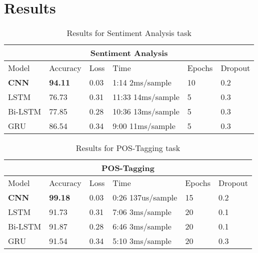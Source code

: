 \documentclass[twocolumn,12pt]{asme2ej}
\begin{document}
\section{Results}

\begin{table*}[t]
  \centering
    \begin{tabular}{ |p{2.5cm}||p{1.5cm}|p{1cm}|p{4cm}|p{1.5cm}|p{1.5cm}|  }
     \hline
     \multicolumn{6}{|c|}{Sentiment Analysis} \\
     \hline
     Model & Accuracy & Loss & Time & Epochs & Dropout\\
     \hline
     \textbf{CNN}   & \textbf{94.11} & 0.03 & 1:14 2ms/sample & 10 & 0.2  \\
     LSTM & 76.73 & 0.31 & 11:33 14ms/sample & 5 & 0.3 \\
     Bi-LSTM & 77.85 & 0.28 & 10:36 13ms/sample & 5 & 0.3 \\
     GRU   & 86.54 & 0.34 & 9:00 11ms/sample & 5 & 0.3 \\
     \hline
    \end{tabular}
  \caption{Results for Sentiment Analysis task}
  \label{tab:1}
\end{table*}

\begin{table*}[t]
  \centering
    \begin{tabular}{ |p{2.5cm}||p{1.5cm}|p{1cm}|p{4cm}|p{1.5cm}|p{1.5cm}|  }
     \hline
     \multicolumn{6}{|c|}{POS-Tagging} \\
     \hline
     Model & Accuracy & Loss & Time & Epochs & Dropout\\
     \hline
     \textbf{CNN}   & \textbf{99.18} & 0.03 & 0:26 137us/sample & 15 & 0.2  \\
     LSTM & 91.73 & 0.31 & 7:06 3ms/sample & 20 & 0.1 \\
     Bi-LSTM & 91.87 & 0.28 & 6:46 3ms/sample & 20 & 0.1 \\
     GRU   & 91.54 & 0.34 & 5:10 3ms/sample & 20 & 0.3 \\
     \hline
    \end{tabular}
  \caption{Results for POS-Tagging task}
  \label{tab:1}
\end{table*}
\end{document}
